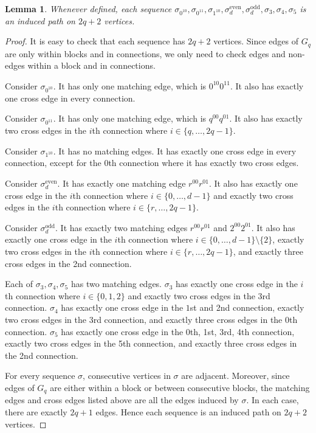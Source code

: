 \documentclass[11pt]{article}
\newtheorem{lemma}[theorem]{Lemma}
\theoremstyle{definition}
\theoremstyle{remark}
\begin{document}
\begin{lemma}\label{lem:routing}
Whenever defined, each sequence $\sigma_{0^{10}}, \sigma_{0^{11}}, \sigma_{1^{10}}, \sigma^{\mathrm{even}}_{d}, \sigma^{\mathrm{odd}}_{d}, \sigma_{3}, \sigma_{4}, \sigma_{5}$ is an induced path on $2q+2$ vertices. 
\end{lemma}
\begin{proof}
It is easy to check that each sequence has $2q+2$ vertices.
Since edges of $G_q$ are only within blocks and in connections, we only need to check edges and non-edges within a block and in connections. 

Consider $\sigma_{0^{10}}$.
It has only one matching edge, which is $0^{10}0^{11}$.
It also has exactly one cross edge in every connection. 

Consider $\sigma_{0^{11}}$.
It has only one matching edge, which is $q^{00}q^{01}$.  
It also has exactly two cross edges in the $i$th connection where $i\in\{q, \ldots, 2q-1\}$. 

Consider $\sigma_{1^{10}}$.
It has no matching edges. 
It has exactly one cross edge in every connection, except for the $0$th connection where it has exactly two cross edges. 

Consider  $\sigma_d^{\mathrm{even}}$.
It has exactly one matching edge $r^{00}r^{01}$. 
It also has exactly one cross edge in the $i$th connection where $i\in\{0, \ldots, d-1\}$ and exactly two cross edges in the $i$th connection where $i\in\{r, \ldots, 2q-1\}$. 

Consider  $\sigma_d^{\mathrm{odd}}$.
It has exactly two matching edges $r^{00}r^{01}$ and $2^{00}2^{01}$. 
It also has exactly one cross edge in the $i$th connection where $i\in\{0, \ldots, d-1\}\setminus\{2\}$, exactly two cross edges in the $i$th connection where $i\in\{r, \ldots, 2q-1\}$, and exactly three cross edges in the 2nd connection. 

Each of $\sigma_3, \sigma_4, \sigma_5$ has two matching edges. 
$\sigma_3$ has exactly one cross edge in the $i$th connection where $i\in\{0,1, 2\}$ and exactly two cross edges in the 3rd connection. 
$\sigma_4$ has exactly one cross edge in the $1$st and 2nd connection, exactly two cross edges in the 3rd connection, and exactly three cross edges in the 0th connection. 
$\sigma_5$ has exactly one cross edge in the $0$th, 1st, 3rd, 4th connection, exactly two cross edges in the 5th connection, and exactly three cross edges in the 2nd connection. 

For every sequence $\sigma$, consecutive vertices in $\sigma$ are adjacent.
Moreover, since edges of $G_q$ are either  within a block or between consecutive blocks, the matching edges and cross edges listed above are all the edges induced by $\sigma$.
In each case, there are exactly  $2q+1$ edges.
Hence each sequence is an induced path on $2q+2$ vertices.
\end{proof}
\end{document}
